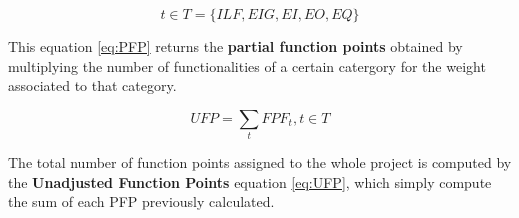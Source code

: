 \begin{displaymath}
	t \in T = {\{ILF, EIG, EI, EO, EQ\}}
\end{displaymath}

This equation \eqref{eq:PFP} returns the \textbf{partial function points} obtained by multiplying the number of functionalities of a certain catergory for the weight associated to that category.

\begin{equation}
	\label{eq:UFP}
	UFP = \sum_{t} FPF_t, t \in T
\end{equation}

The total number of function points assigned to the whole project is computed by the \textbf{Unadjusted Function Points} equation \eqref{eq:UFP}, which simply compute the sum of each PFP previously calculated.
